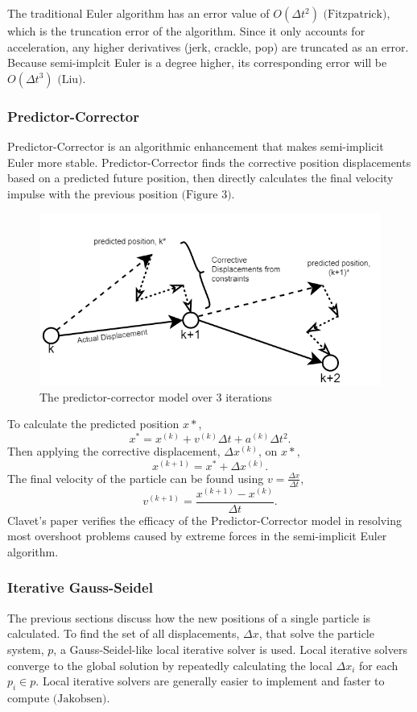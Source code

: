 \documentclass[12pt, letterpaper]{article}
\begin{document}
The traditional Euler algorithm has an error value of $O(\Delta t^{2})$ $\text{(Fitzpatrick)}$, which is the truncation error of the algorithm. Since it only accounts for acceleration, any higher derivatives (jerk, crackle, pop) are truncated as an error. Because semi-implcit Euler is a degree higher, its corresponding error will be $O(\Delta t^{3})$ $\text{(Liu)}$. 

\subsubsection{Predictor-Corrector}
\hspace{\parindent} Predictor-Corrector is an algorithmic enhancement that makes semi-implicit Euler more stable. Predictor-Corrector finds the corrective position displacements based on a predicted future position, then directly calculates the final velocity impulse with the previous position $\text{(Figure 3)}$. 
\begin{figure}[H]
\centering
\includegraphics[width=13cm]{predictor.png}
\caption{The predictor-corrector model over 3 iterations}
\label{fig:figure}
\end{figure}
\noindent To calculate the predicted position $x*$,
$$x^{*} =  x^{(k)}  + v^{(k)}\Delta t + a^{(k)}\Delta t^{2}.$$
Then applying the corrective displacement, $\Delta x^{(k)}$, on $x*$,
$$x^{(k + 1)} = x^{*} + \Delta x^{(k)}.$$
The final velocity of the particle can be found using $v = \frac{\Delta x}{\Delta t}$,
\begin{equation}
    v^{(k+1)} = \frac{x^{(k + 1)} - x^{(k)}}{\Delta t}.
\end{equation}
Clavet's paper verifies the efficacy of the Predictor-Corrector model in resolving most overshoot problems caused by extreme forces in the semi-implicit Euler algorithm.

\subsubsection{Iterative Gauss-Seidel}
\hspace{\parindent} The previous sections discuss how the new positions of a single particle is calculated. To find the set of all displacements, $\Delta x$, that solve the particle system, $p$, a Gauss-Seidel-like local iterative solver is used. Local iterative solvers converge to the global solution by repeatedly calculating the local $\Delta x_i$ for each $p_i \in p$. Local iterative solvers are generally easier to implement and faster to compute $\text{(Jakobsen)}$.
\end{document}
